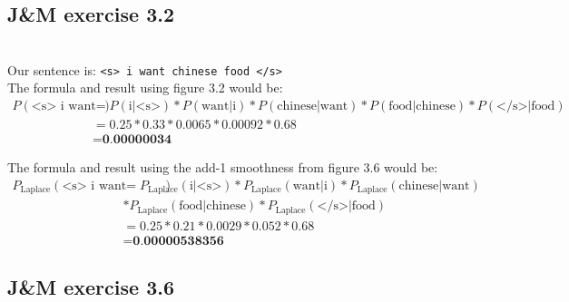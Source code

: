 \documentclass[a4paper, 11pt]{article}
\begin{document}
\subsection{J\&M exercise 3.2}

\noindent{}\\

Our sentence is:
\texttt{<s> i want chinese food </s>}\\

The formula and result using figure 3.2 would be:
\begin{equation}
	\begin{split}
		P(\text{<s> i want chinese food </s>}) & = P(\text{i}|\text{<s>}) * P(\text{want}|\text{i}) * P(\text{chinese}|\text{want}) * P(\text{food}|\text{chinese}) * P(\text{</s>}|\text{food}) \\
		& = 0.25 * 0.33 * 0.0065 * 0.00092 * 0.68 \\
		& = \textbf{0.00000034}
	\end{split}
\end{equation}

The formula and result using the add-1 smoothness from figure 3.6 would be:
\begin{equation}
	\begin{split}
		P_{\text{Laplace}}(\text{<s> i want chinese food </s>}) & = P_{\text{Laplace}}(\text{i}|\text{<s>}) * P_{\text{Laplace}}(\text{want}|\text{i}) * P_{\text{Laplace}}(\text{chinese}|\text{want}) \\& * P_{\text{Laplace}}(\text{food}|\text{chinese}) * P_{\text{Laplace}}(\text{</s>}|\text{food}) \\
		& = 0.25 * 0.21 * 0.0029 * 0.052 * 0.68 \\
		& = \textbf{0.00000538356}
	\end{split}
\end{equation}


\subsection{J\&M exercise 3.6}

\noindent{}\\
\end{document}
